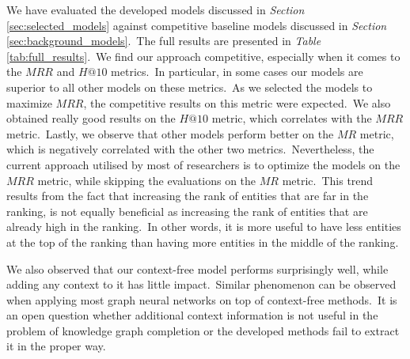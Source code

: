 \documentclass[longabstract, english, mgr]{iithesis}
\theoremstyle{default_theorem_style}\newtheorem{theorem}{Theorem}
\theoremstyle{default_theorem_style}\newtheorem{definition}{Definition}
\begin{document}
\noindent We have evaluated the developed models discussed in \textit{Section} \ref{sec:selected_models} against
competitive baseline models discussed in \textit{Section} \ref{sec:background_models}.\ The full results are presented
in \textit{Table} \ref{tab:full_results}.\ We find our approach competitive, especially when it comes to
the $MRR$ and $H@10$ metrics.\ In particular, in some cases our models are superior to all other models on these
metrics.\ As we selected the models to maximize $MRR$, the competitive results on this metric were expected.\ We also
obtained really good results on the $H@10$ metric, which correlates with the $MRR$ metric.\ Lastly, we observe that
other models perform better on the $MR$ metric, which is negatively correlated with the other two
metrics.\ Nevertheless, the current approach utilised by most of researchers is to optimize the models on the $MRR$
metric, while skipping the evaluations on the $MR$ metric.\ This trend results from the fact that increasing the rank
of entities that are far in the ranking, is not equally beneficial as increasing the rank of entities that are already
high in the ranking.\ In other words, it is more useful to have less entities at the top of the ranking than having
more entities in the middle of the ranking.\newline

\noindent We also observed that our context-free model performs surprisingly well, while adding any context to it
has little impact.\ Similar phenomenon can be observed when applying most graph neural networks on top of
context-free methods.\ It is an open question whether additional context information is not useful in the problem
of knowledge graph completion or the developed methods fail to extract it in the proper way.
\end{document}
